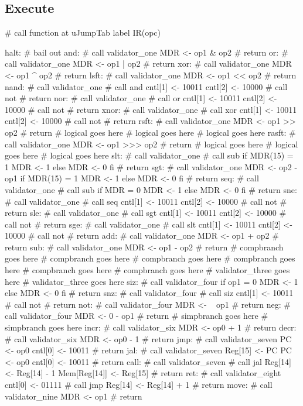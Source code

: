 \documentclass[12pt]{article}
\begin{document}
\subsection{Execute}
\begin{verbatimtab}
# call function at uJumpTab label IR(opc)

halt:
	# bail out
and:
	# call validator_one
	MDR <- op1 & op2
	# return
or:
	# call validator_one
	MDR <- op1 | op2
	# return
xor:
	# call validator_one
	MDR <- op1 ^ op2
	# return
lsft:
	# call validator_one
	MDR <- op1 << op2
	# return
nand:
	# call validator_one
	# call and
	cntl[1] <- 10011
	cntl[2] <- 10000
	# call not
	# return
nor:
	# call validator_one
	# call or
	cntl[1] <- 10011
	cntl[2] <- 10000
	# call not
	# return
xnor:
	# call validator_one
	# call xor
	cntl[1] <- 10011
	cntl[2] <- 10000
	# call not
	# return
rsft:
	# call validator_one
	MDR <- op1 >> op2
	# return
# logical goes here
# logical goes here
# logical goes here
rasft:
	# call validator_one
	MDR <- op1 >>> op2
	# return
# logical goes here
# logical goes here
# logical goes here
slt:
	# call validator_one
	# call sub
	if MDR(15) = 1
		MDR <- 1
	else
		MDR <- 0
	fi
	# return
sgt:
	# call validator_one
	MDR <- op2 - op1
	if MDR(15) = 1
		MDR <- 1
	else
		MDR <- 0
	fi
	# return
seq:
	# call validator_one
	# call sub
	if MDR = 0
		MDR <- 1
	else
		MDR <- 0
	fi
	# return
sne:
	# call validator_one
	# call seq
	cntl[1] <- 10011
	cntl[2] <- 10000
	# call not
	# return
sle:
	# call validator_one
	# call sgt
	cntl[1] <- 10011
	cntl[2] <- 10000
	# call not
	# return
sge:
	# call validator_one
	# call slt
	cntl[1] <- 10011
	cntl[2] <- 10000
	# call not
	# return
add:
	# call validator_one
	MDR <- op1 + op2
	# return
sub:
	# call validator_one
	MDR <- op1 - op2
	# return
# compbranch goes here
# compbranch goes here
# compbranch goes here
# compbranch goes here
# compbranch goes here
# compbranch goes here
# validator_three goes here
# validator_three goes here
siz:
	# call validator_four
	if op1 = 0
	   MDR <- 1
	else
	   MDR <- 0
	fi
	# return
snz:
	# call validator_four
	# call siz
	cntl[1] <- 10011
	# call not
	# return
not:
	# call validator_four
	MDR <- ~ op1
	# return
neg:
	# call validator_four
	MDR <- 0 - op1
	# return
# simpbranch goes here
# simpbranch goes here
incr:
	# call validator_six
	MDR <- op0 + 1
	# return
decr:
	# call validator_six
	MDR <- op0 - 1
	# return
jmp:
	# call validator_seven
	PC <- op0
	cntl[0] <- 10011
	# return
jal:
	# call validator_seven
	Reg[15] <- PC
	PC <- op0
	cntl[0] <- 10011
	# return
call:
	# call validator_seven
	# call jal
	Reg[14] <- Reg[14] - 1
	Mem[Reg[14]] <- Reg[15]
	# return
ret:
	# call validator_eight
	cntl[0] <- 01111
	# call jmp
	Reg[14] <- Reg[14] + 1
	# return
move:
	# call validator_nine
	MDR <- op1
	# return


\end{verbatimtab}
\end{document}
